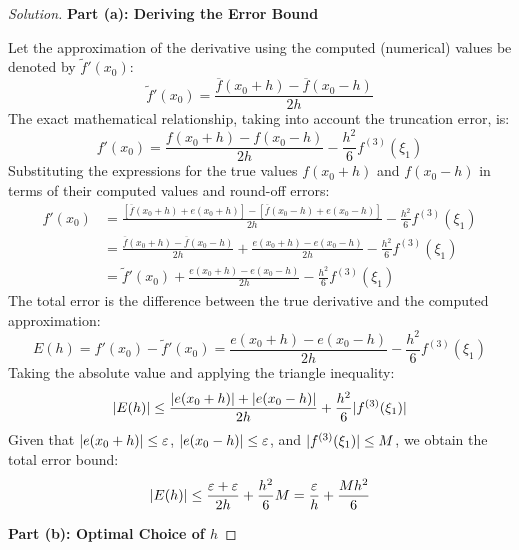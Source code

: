 \documentclass[11pt, a4paper]{article}
\newcommand{\eps}{\varepsilon}
\DeclarePairedDelimiter\abs{\lvert}{\rvert}
\newif\ifsolutionnewpage
\newenvironment{solution}
  {\begin{proof}[Solution]}
  {\end{proof}\ifsolutionnewpage\newpage\fi}
\begin{document}
        \begin{solution}
        \textbf{Part (a): Deriving the Error Bound}
        
        Let the approximation of the derivative using the computed (numerical) values be denoted by $\tilde{f}'(x_0)$:
        \begin{equation*}
        \tilde{f}'(x_0) = \frac{\overline{f}(x_0+h) - \overline{f}(x_0-h)}{2h}
        \end{equation*}
        The exact mathematical relationship, taking into account the truncation error, is:
        \begin{equation*}
        f'(x_0) = \frac{f(x_0+h) - f(x_0-h)}{2h} - \frac{h^2}{6}f^{(3)}(\xi_1)
        \end{equation*}
        Substituting the expressions for the true values $f(x_0+h)$ and $f(x_0-h)$ in terms of their computed values and round-off errors:
        \begin{align*}
        f'(x_0) &= \frac{[\overline{f}(x_0+h) + e(x_0+h)] - [\overline{f}(x_0-h) + e(x_0-h)]}{2h} - \frac{h^2}{6}f^{(3)}(\xi_1) \\
        &= \frac{\overline{f}(x_0+h) - \overline{f}(x_0-h)}{2h} + \frac{e(x_0+h) - e(x_0-h)}{2h} - \frac{h^2}{6}f^{(3)}(\xi_1) \\
        &= \tilde{f}'(x_0) + \frac{e(x_0+h) - e(x_0-h)}{2h} - \frac{h^2}{6}f^{(3)}(\xi_1)
        \end{align*}
        The total error is the difference between the true derivative and the computed approximation:
        \begin{equation*}
        E(h) = f'(x_0) - \tilde{f}'(x_0) = \frac{e(x_0+h) - e(x_0-h)}{2h} - \frac{h^2}{6}f^{(3)}(\xi_1)
        \end{equation*}
        Taking the absolute value and applying the triangle inequality:
        \begin{equation*}
        \abs{E(h)} \le \frac{\abs{e(x_0+h)} + \abs{e(x_0-h)}}{2h} + \frac{h^2}{6}\abs{f^{(3)}(\xi_1)}
        \end{equation*}
        Given that $\abs{e(x_0+h)} \le \eps$, $\abs{e(x_0-h)} \le \eps$, and $\abs{f^{(3)}(\xi_1)} \le M$, we obtain the total error bound:
        \begin{equation}
        \abs{E(h)} \le \frac{\eps + \eps}{2h} + \frac{h^2}{6}M = \frac{\eps}{h} + \frac{Mh^2}{6}
        \end{equation}
        
        \vspace{0.3cm}
        \textbf{Part (b): Optimal Choice of $h$}
        

\end{solution}
\end{document}
